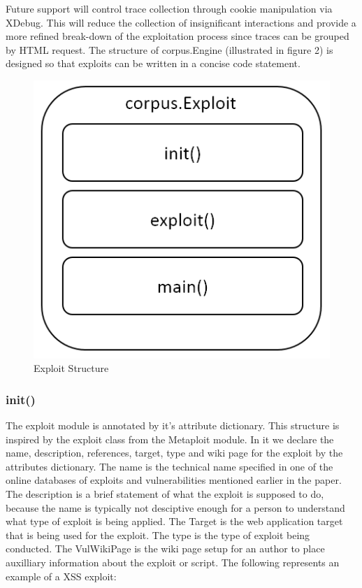 \documentclass[letterpaper,twocolumn,10pt]{article}
\begin{document}
  Future support will control trace collection through cookie manipulation via XDebug. This will reduce the collection of insignificant interactions and provide a more refined break-down of the exploitation process since traces can be grouped by HTML request.  The structure of corpus.Engine (illustrated in figure 2) is designed so that exploits can be written in a concise code statement.

\begin{figure}[!tp]
\begin{center}
\includegraphics[scale=.5]{Corpus_Exploit.PNG}
\end{center}
\caption{Exploit Structure}
\end{figure}

\subsubsection{init()}

The exploit module is annotated by it's attribute dictionary. This structure is inspired by the exploit class from the Metaploit module. In it we declare the name, description, references, target, type and wiki page for the exploit by the attributes dictionary.  The name is the technical name specified in one of the online databases of exploits and vulnerabilities mentioned earlier in the paper.  The description is a brief statement of what the exploit is supposed to do, because the name is typically not desciptive enough for a person to understand what type of exploit is being applied.  The Target is the web application target that is being used for the exploit.  The type is the type of exploit being conducted.  The VulWikiPage is the wiki page setup for an author to place auxilliary information about the exploit or script.  The following represents an example of a XSS exploit:\\
\end{document}
